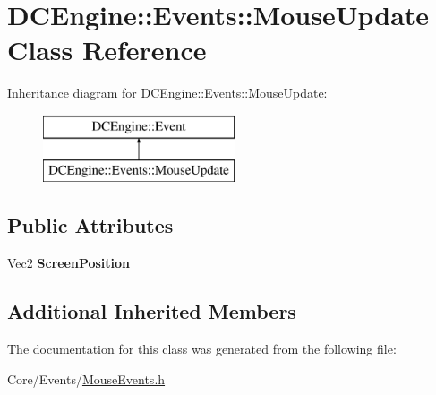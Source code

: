 \hypertarget{classDCEngine_1_1Events_1_1MouseUpdate}{\section{D\-C\-Engine\-:\-:Events\-:\-:Mouse\-Update Class Reference}
\label{classDCEngine_1_1Events_1_1MouseUpdate}
}
Inheritance diagram for D\-C\-Engine\-:\-:Events\-:\-:Mouse\-Update\-:\begin{figure}[H]
\begin{center}
\leavevmode
\includegraphics[height=2.000000cm]{classDCEngine_1_1Events_1_1MouseUpdate}
\end{center}
\end{figure}
\subsection*{Public Attributes}
\begin{DoxyCompactItemize}
\item 
\hypertarget{classDCEngine_1_1Events_1_1MouseUpdate_af558e0f54190771598079e2af45b3297}{Vec2 {\bfseries Screen\-Position}}\label{classDCEngine_1_1Events_1_1MouseUpdate_af558e0f54190771598079e2af45b3297}

\end{DoxyCompactItemize}
\subsection*{Additional Inherited Members}


The documentation for this class was generated from the following file\-:\begin{DoxyCompactItemize}
\item 
Core/\-Events/\hyperlink{MouseEvents_8h}{Mouse\-Events.\-h}\end{DoxyCompactItemize}
